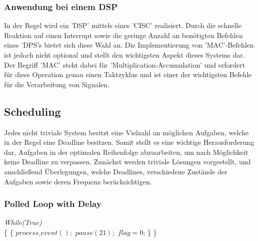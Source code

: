 \subsubsection{Anwendung bei einem DSP}
In der Regel wird ein 'DSP' mittels eines 'CISC' realisiert. Durch die schnelle Reaktion auf einen Interrupt sowie die geringe Anzahl an benötigten Befehlen eines 'DPS's bietet sich diese Wahl an. Die Implementierung von 'MAC'-Befehlen ist jedoch nicht optional und stellt den wichtigsten Aspekt dieses Systems dar. Der Begriff 'MAC' steht dabei für 'Multiplication-Accumulation' und erfordert für diese Operation genau einen Taktzyklus und ist einer der wichtigsten Befehle für die Verarbeitung von Signalen.

\subsection{Scheduling}\label{2.6}
Jedes nicht triviale System besitzt eine Vielzahl an möglichen Aufgaben, welche in der Regel eine Deadline besitzen. Somit stellt es eine wichtige Herausforderung dar, Aufgaben in der optimalen Reihenfolge abzuarbeiten, um nach Möglichkeit keine Deadline zu verpassen. Zunächst werden triviale Lösungen vorgestellt, und anschließend Überlegungen, welche Deadlines, verschiedene Zustände der Aufgaben sowie deren Frequenz berücksichtigen.

\subsubsection{Polled Loop with Delay}

\begin{algorithm}
\label{sced1}
\begin{algorithmic}[1]

\BState \textit{While(True)}\\
\{
 \{
\State $process\_event();$
\State $pause(21);$
\State $flag=0$;
\}
\EndIf
\}

\end{algorithmic}
\end{algorithm}

